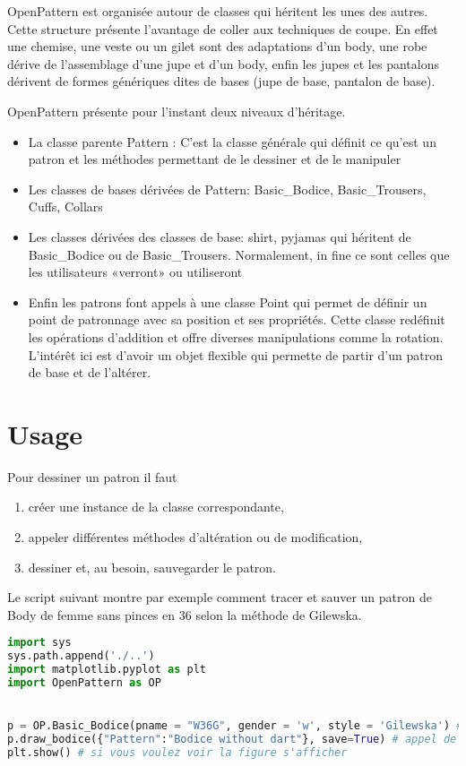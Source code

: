 \documentclass[11pt,a4paper]{report}
\begin{document}
OpenPattern est organisée autour de classes qui héritent les unes des autres. Cette structure présente l'avantage de coller aux techniques de coupe. En effet une chemise, une veste ou un gilet sont des adaptations d'un body, une robe dérive de l'assemblage d'une jupe et d'un body, enfin les jupes et les pantalons dérivent de formes génériques dites de bases (jupe de base, pantalon de base).

OpenPattern présente pour l'instant deux niveaux d'héritage.
\begin{itemize}
\item La classe parente Pattern : C'est la classe générale qui définit ce qu'est un patron et les méthodes permettant de le dessiner et de le manipuler
\item Les classes de bases dérivées de Pattern: Basic\_Bodice, Basic\_Trousers, Cuffs, Collars
\item Les classes dérivées des classes de base: shirt, pyjamas qui héritent de Basic\_Bodice ou de Basic\_Trousers. Normalement, in fine ce sont celles que les utilisateurs «verront» ou utiliseront
\item Enfin les patrons font appels à une classe Point qui permet de définir un point de patronnage avec sa position et ses propriétés. Cette classe redéfinit les opérations d'addition et offre diverses manipulations  comme la rotation. L'intérêt ici est d'avoir un objet flexible qui permette de partir d'un patron de base et de l'altérer.
\end{itemize}



\chapter{Usage}

Pour dessiner un patron il faut
\begin{enumerate}
\item créer une instance de la classe correspondante,
\item appeler différentes méthodes d'altération ou de modification,
\item dessiner et, au besoin, sauvegarder le patron.
\end{enumerate}

Le script suivant montre par exemple comment tracer et sauver un patron de Body de femme sans pinces en 36 selon la méthode de Gilewska.
\begin{lstlisting}[language=python]
import sys
sys.path.append('./..')
import matplotlib.pyplot as plt
import OpenPattern as OP


p = OP.Basic_Bodice(pname = "W36G", gender = 'w', style = 'Gilewska') # Création de l'instance
p.draw_bodice({"Pattern":"Bodice without dart"}, save=True) # appel de la fonction de dessin
plt.show() # si vous voulez voir la figure s'afficher
\end{lstlisting}
\end{document}
